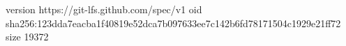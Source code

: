 version https://git-lfs.github.com/spec/v1
oid sha256:123dda7eacba1f40819e52dca7b097633ee7c142b6fd78171504c1929e21ff72
size 19372
